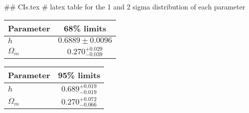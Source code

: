 ## CIs.tex
# latex table for the 1 and 2 sigma distribution of each parameter

\begin{tabular} { l  c}
 Parameter &  68\% limits\\
\hline
{\boldmath$h              $} & $0.6889\pm 0.0096          $\\
{\boldmath$\Omega_m       $} & $0.270^{+0.029}_{-0.039}   $\\
\hline
\end{tabular}

\begin{tabular} { l  c}
 Parameter &  95\% limits\\
\hline
{\boldmath$h              $} & $0.689^{+0.019}_{-0.019}   $\\
{\boldmath$\Omega_m       $} & $0.270^{+0.072}_{-0.066}   $\\
\hline
\end{tabular}
